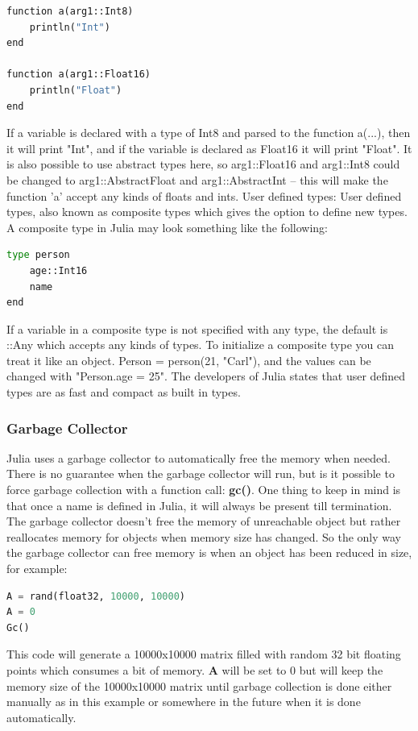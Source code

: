\documentclass[a4paper,11pt]{article}
\begin{document}
\begin{lstlisting}[language=python]
function a(arg1::Int8)
	println("Int")  
end

function a(arg1::Float16)  
	println("Float")  
end    
\end{lstlisting}

If a variable is declared with a type of Int8 and parsed to the function a(...), then it will print "Int", and if the variable is declared as Float16 it will print "Float". It is also possible to use abstract types here, so arg1::Float16 and arg1::Int8 could be changed to arg1::AbstractFloat and arg1::AbstractInt – this will make the function 'a' accept any kinds of floats and ints.  
User defined types: User defined types, also known as composite types which gives the option to define new types. A composite type in Julia may look something like the following: 
\begin{lstlisting}[language=python]
type person 
	age::Int16 
	name 
end    
\end{lstlisting}
If a variable in a composite type is not specified with any type, the default is ::Any which accepts any kinds of types. To initialize a composite type you can treat it like an object. Person = person(21, "Carl"), and the values can be changed with "Person.age = 25". The developers of Julia states that user defined types are as fast and compact as built in types. 

\subsubsection{Garbage Collector}
Julia uses a garbage collector to automatically free the memory when needed. There is no guarantee when the garbage collector will run, but is it possible to force garbage collection with a function call: \textbf{gc()}. One thing to keep in mind is that once a name is defined in Julia, it will always be present till termination. The garbage collector doesn't free the memory of unreachable object but rather reallocates memory for objects when memory size has changed. So the only way the garbage collector can free memory is when an object has been reduced in size, for example:

\begin{lstlisting}[language=python]
A = rand(float32, 10000, 10000) 
A = 0
Gc() 
\end{lstlisting}
This code will generate a 10000x10000 matrix filled with random 32 bit floating points which consumes a bit of memory. \textbf{A} will be set to 0 but will keep the memory size of the 10000x10000 matrix until garbage collection is done either manually as in this example or somewhere in the future when it is done automatically. 
\end{document}
